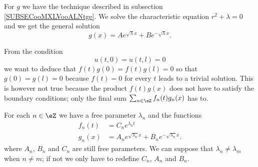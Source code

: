 For \( g\) we have the technique described in subsection \ref{SUBSECooMXLVooALNtge}. We solve the characteristic equation $r^2+\lambda=0$ and we get the general solution
\begin{equation}
    g(x)=A e^{\sqrt{ \lambda }x}+B e^{-\sqrt{ \lambda }x}.
\end{equation}

From the condition
\begin{equation}
    u(t,0)=u(t,l)=0
\end{equation}
we want to deduce that \( f(t)g(0)=f(t)g(l)=0\) so that \( g(0)=g(l)=0\) because \( f(t)=0\) for every \( t\) leads to a trivial solution. This is however not true because the product \( f(t)g(x)\) does not have to satisfy the boundary conditions; only the final sum \( \sum_{n\in \eZ}f_n(t)g_n(x)\) has to.

For each \( n\in \eZ\) we have a free parameter \( \lambda_n\) and the functions
\begin{subequations}
    \begin{align}
        f_n(t)&=C_n e^{\lambda_n t}\\
        g_n(x)&=A_n e^{\sqrt{ \lambda_n }x}+B_n e^{-\sqrt{ \lambda_n }x}.
    \end{align}
\end{subequations}
where \( A_n\), \( B_n\) and \( C_n\) are still free parameters. We can suppose that \( \lambda_n\neq \lambda_m\) when \( n\neq m\); if not we only have to redefine \( C_n\), \( A_n\) and \( B_n\).

